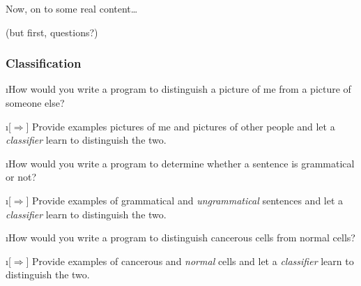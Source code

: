 \documentclass{beamer}
\newcommand{\blue}[1]{{\color{blue}#1}}
\newcommand{\green}[1]{{\color{DarkGreen}#1}}
\newcommand{\black}[1]{{\color{black}#1}}
\newcommand{\red}[1]{{\color{red}#1}}
\begin{document}
\begin{frame}
\begin{center}
\blue{\huge Now, on to some \black{real} content\dots}
\end{center}
\hspace{20em}(but first, questions?)
\end{frame}



\begin{frame}
\frametitle{Classification}

\bei

\i How would you write a program to distinguish a \green{picture} of
\red{me} from a picture of \blue{someone else}?

\bei
\i<2->[$\Rightarrow$] Provide examples pictures of \red{me} and
pictures of \blue{other people} and let a \emph{classifier} learn to
distinguish the two.
\eni

\i How would you write a program to determine whether a
\green{sentence} is \red{grammatical} or \blue{not}?

\bei
\i<3->[$\Rightarrow$] Provide examples of \red{grammatical} and
\emph{ungrammatical} sentences and let a \emph{classifier} learn to
distinguish the two.
\eni

\i How would you write a program to distinguish \red{cancerous}
\green{cells} from \blue{normal} \green{cells}?

\bei
\i<4->[$\Rightarrow$] Provide examples of \red{cancerous} and
\emph{normal} cells and let a \emph{classifier} learn to distinguish
the two.
\eni
\eni
\end{frame}
\end{document}
